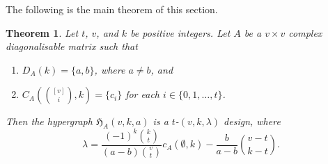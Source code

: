 \documentclass[11pt]{article}
\newtheorem{theorem}{Theorem}[section]
\begin{document}

The following is the main theorem of this section. 
\begin{theorem}\label{thm:des}
Let $t$, $v$, and $k$ be positive integers. 
Let $A$ be a $v\times v$ complex diagonalisable matrix such that 
\begin{enumerate}
    \item $D_A(k)=\{a,b\}$, where $a\neq b$, and
    \item $C_A\left(\binom{[v]}{i},k\right) = \{c_i\}$ for each $i \in \{0,1,\dots,t\}$.
\end{enumerate}
Then the hypergraph $\mathfrak H_{A}(v,k,a)$ is a $t$-$(v,k,\lambda)$ design, where 
\[
\lambda=\frac{(-1)^k\binom{k}{t}}{(a-b)\binom{v}{t}}c_A(\emptyset,k)-\frac{b}{a-b}\binom{v-t}{k-t}.
\]
\end{theorem}
\end{document}
